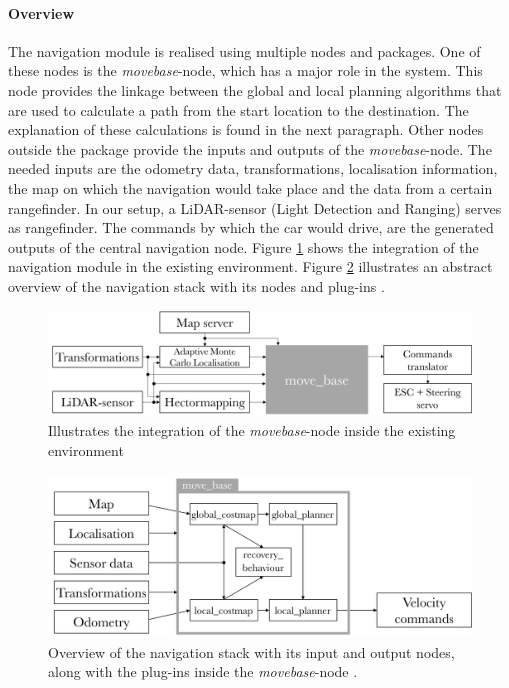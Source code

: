\documentclass[conference,a4paper]{IEEEtran}
\begin{document}
\paragraph{Overview}
The navigation module is realised using multiple nodes and packages. One of these nodes is the \emph{move\textunderscore base}-node, which has a major role in the system. This node provides the linkage between the global and local planning algorithms that are used to calculate a path from the start location to the destination. The explanation of these calculations is found in the next paragraph. Other nodes outside the package provide the inputs and outputs of the \emph{move\textunderscore base}-node. The needed inputs are the odometry data, transformations, localisation information, the map on which the navigation would take place and the data from a certain rangefinder. In our setup, a LiDAR-sensor (Light Detection and Ranging) serves as rangefinder. The commands by which the car would drive, are the generated outputs of the central navigation node. Figure \ref{fig:navstack_overall} shows the integration of the navigation module in the existing environment. Figure \ref{fig:navstack_global} illustrates an abstract overview of the navigation stack with its nodes and plug-ins \cite{Marder-Eppstein2016}. 
\begin{figure}[!t]
	\includegraphics[width=\columnwidth]{navstack_overall}
	\centering
	\caption{Illustrates the integration of the \emph{move\textunderscore base}-node inside the existing environment}
	\label{fig:navstack_overall}
\end{figure}
\begin{figure}[!t]
	\includegraphics[width=\columnwidth]{navstack3}
	\centering
	\caption{Overview of the navigation stack with its input and output nodes, along with the plug-ins inside the \emph{move\textunderscore base}-node \cite{Marder-Eppstein2016}.}
	\label{fig:navstack_global}
\end{figure}
\end{document}
